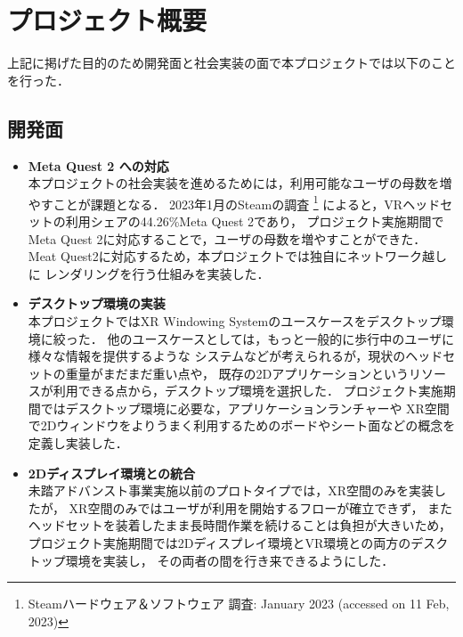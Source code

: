 \section{プロジェクト概要}

上記に掲げた目的のため開発面と社会実装の面で本プロジェクトでは以下のことを行った．

\subsection{開発面}

\begin{itemize}
      \item \textbf{Meta Quest 2 への対応} \\
            本プロジェクトの社会実装を進めるためには，利用可能なユーザの母数を増やすことが課題となる．
            2023年1月のSteamの調査
            \footnote{Steamハードウェア＆ソフトウェア 調査: January 2023 (accessed on 11 Feb, 2023)}
            によると，VRヘッドセットの利用シェアの44.26\%Meta Quest 2であり，
            プロジェクト実施期間でMeta Quest 2に対応することで，ユーザの母数を増やすことができた．
            Meat Quest2に対応するため，本プロジェクトでは独自にネットワーク越しに
            レンダリングを行う仕組みを実装した．
      \item \textbf{デスクトップ環境の実装} \\
            本プロジェクトではXR Windowing Systemのユースケースをデスクトップ環境に絞った．
            他のユースケースとしては，もっと一般的に歩行中のユーザに様々な情報を提供するような
            システムなどが考えられるが，現状のヘッドセットの重量がまだまだ重い点や，
            既存の2Dアプリケーションというリソースが利用できる点から，デスクトップ環境を選択した．
            プロジェクト実施期間ではデスクトップ環境に必要な，アプリケーションランチャーや
            XR空間で2Dウィンドウをよりうまく利用するためのボードやシート面などの概念を定義し実装した．
      \item \textbf{2Dディスプレイ環境との統合} \\
            未踏アドバンスト事業実施以前のプロトタイプでは，XR空間のみを実装したが，
            XR空間のみではユーザが利用を開始するフローが確立できず，
            またヘッドセットを装着したまま長時間作業を続けることは負担が大きいため，
            プロジェクト実施期間では2Dディスプレイ環境とVR環境との両方のデスクトップ環境を実装し，
            その両者の間を行き来できるようにした．
\end{itemize}


